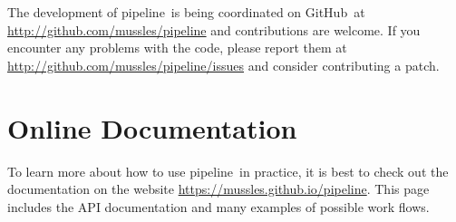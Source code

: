 \documentclass[12pt,preprint]{aastex}
\newcommand{\project}[1]{{\sffamily #1}}
\newcommand{\github}{\project{GitHub}}
\newcommand{\thisplain}{pipeline}
\newcommand{\this}{\project{\thisplain}}
\begin{document}
The development of \this\ is being coordinated on \github\ at
\url{http://github.com/mussles/pipeline} and contributions are welcome. If you
encounter any problems with the code, please report them at
\url{http://github.com/mussles/pipeline/issues} and consider
contributing a patch.

\section{Online Documentation}

To learn more about how to use \this\ in practice, it is best to check out the
documentation on the website \url{https://mussles.github.io/pipeline}. This page includes
the API documentation and many examples of possible work flows.
\end{document}
